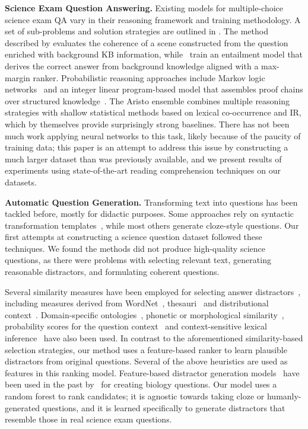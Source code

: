 \textbf{Science Exam Question Answering.} Existing models for multiple-choice science exam QA vary in their reasoning framework and training methodology. A set of sub-problems and solution strategies are outlined in .
The method described by  evaluates the coherence of a scene constructed from the question enriched with background KB information, while~
train an entailment model that derives the correct answer from background knowledge aligned with a max-margin ranker. Probabilistic reasoning approaches include Markov logic networks~\cite{Khot2015MLN} and an integer linear program-based model that assembles proof chains over structured knowledge~\cite{Khot2016TableILP}.  The Aristo ensemble \cite{Clark2016Combining} combines multiple reasoning strategies with shallow statistical methods based on lexical co-occurrence and IR, which by themselves provide surprisingly strong baselines.  There has not been much work applying neural networks to this task, likely because of the paucity of training data; this paper is an attempt to address this issue by constructing a much larger dataset than was previously available, and we present results of experiments using state-of-the-art reading comprehension techniques on our datasets.

\textbf{Automatic Question Generation.} Transforming text into questions has been tackled before, mostly for didactic purposes. Some approaches rely on syntactic transformation templates~\cite{Mitkov2003ComputerAided,Heilman2010GoodQuestion}, while most others generate cloze-style questions. Our first attempts at constructing a science question dataset followed these techniques. We found the methods did not produce high-quality science questions, as there were problems with selecting relevant text, generating reasonable distractors, and formulating coherent questions.

Several similarity measures have been employed for selecting answer distractors~\cite{Mitkov2009Semantic}, including measures derived from WordNet~\cite{Mitkov2003ComputerAided}, thesauri~\cite{Sumita2005Measuring} and distributional context~\cite{Pino2008Selection,Aldabe2010Automatic}. Domain-specific ontologies~\cite{Papasalouros2009Automatic}, phonetic or morphological similarity~\cite{Pino2009Semi-automatic,Correia2010Automatic}, probability scores for the question context~\cite{Mostow2012Diagnostic} and context-sensitive lexical inference~\cite{Zesch2014Automatic} have also been used. In contrast to the aforementioned similarity-based selection strategies, our method uses a feature-based ranker to learn plausible distractors from original questions. Several of the above heuristics are used as features in this ranking model.  Feature-based distractor generation models~\cite{Sakaguchi2013Discriminative} have been used in the past by~ for creating biology questions. Our model uses a random forest to rank candidates; it is agnostic towards taking cloze or humanly-generated questions, and it is learned specifically to generate distractors that resemble those in real science exam questions.

